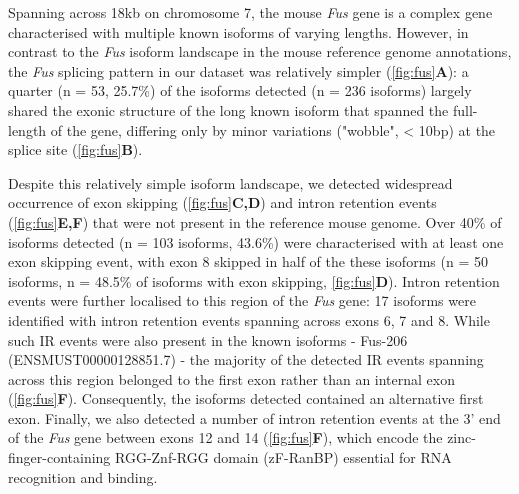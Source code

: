 Spanning across 18kb on chromosome 7, the mouse \textit{Fus} gene is a complex gene characterised with multiple known isoforms of varying lengths. However, in contrast to the \textit{Fus} isoform landscape in the mouse reference genome annotations, the \textit{Fus} splicing pattern in our dataset was relatively simpler (\cref{fig:fus}\textbf{A}): a quarter (n = 53, 25.7\%) of the isoforms detected (n = 236 isoforms) largely shared the exonic structure of the long known isoform that spanned the full-length of the gene, differing only by minor variations ("wobble", < 10bp) at the splice site (\cref{fig:fus}\textbf{B}). 

Despite this relatively simple isoform landscape, we detected widespread occurrence of exon skipping (\cref{fig:fus}\textbf{C,D}) and intron retention events (\cref{fig:fus}\textbf{E,F}) that were not present in the reference mouse genome. Over 40\% of isoforms detected (n = 103 isoforms, 43.6\%) were characterised with at least one exon skipping event, with exon 8 skipped in half of the these isoforms (n = 50 isoforms, n = 48.5\% of isoforms with exon skipping, \cref{fig:fus}\textbf{D}). Intron retention events were further localised to this region of the \textit{Fus} gene: 17 isoforms were identified with intron retention events spanning across exons 6, 7 and 8. While such IR events were also present in the known isoforms - Fus-206 (ENSMUST00000128851.7) - the majority of the detected IR events spanning across this region belonged to the first exon rather than an internal exon (\cref{fig:fus}\textbf{F}). Consequently, the isoforms detected contained an alternative first exon. Finally, we also detected a number of intron retention events at the 3' end of the \textit{Fus} gene between exons 12 and 14 (\cref{fig:fus}\textbf{F}), which encode the zinc-finger-containing RGG-Znf-RGG domain (zF-RanBP) essential for RNA recognition and binding\cite{Wang2015c}. 

